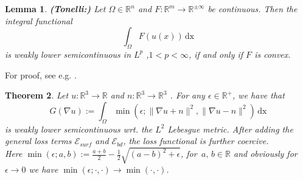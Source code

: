 \documentclass[12pt,openany]{book}
\newcommand{\R}{\mathbb{R}}
\theoremstyle{plainnormal}
\newtheorem{theorem}{Theorem}[section]
\newtheorem{lemma}[theorem]{Lemma}
\theoremstyle{remark}
\begin{document}
\begin{lemma}\textbf{(Tonelli:)}
    Let $\Omega \in \R^n$ and $F:\R^m\rightarrow\R^{\pm\infty}$ be continuous. Then the integral functional $$\int_\Omega F(u(x))\,\mathrm{dx}$$
    is weakly lower semicontinuous in $L^p$ ,$1<p<\infty$, if and only if $F$ is convex.
\end{lemma}
For proof, see e.g. \cite{Dacorogna}.
\begin{theorem}\label{min_lsc}
    Let $u:\R^3\rightarrow\R$ and $n: \R^3\rightarrow\R^3$ . For any $\epsilon \in \R^+$, we have that $$G(\nabla u) := \int_\Omega \min (\epsilon; \|\nabla u+ n\|^2,\|\nabla u - n\|^2)\,\mathrm{dx}$$ is weakly lower semicontinuous wrt.  the $L^2$ Lebesgue metric. After adding the general loss terms $\mathcal{E}_{surf}$ and $\mathcal{E}_{bd}$, the loss functional is further coercive.\\
    Here $\min(\epsilon;a,b) := \frac{a + b}{2} - \frac{1}{2}\sqrt{(a-b)^2 + \epsilon}$, for $\,a,\,b \in \R$ and obviously for $\epsilon  \rightarrow 0$ we have $\min(\epsilon; \cdot, \cdot) \rightarrow \min(\cdot, \cdot)$. 
\end{theorem}
\end{document}
